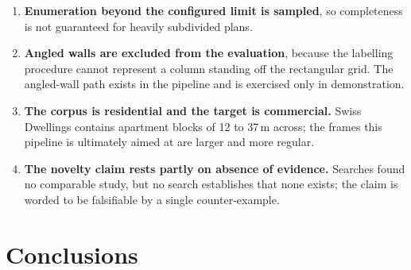 \begin{enumerate}
\item \textbf{Enumeration beyond the configured limit is sampled}, so
completeness is not guaranteed for heavily subdivided plans.

\item \textbf{Angled walls are excluded from the evaluation}, because the
labelling procedure cannot represent a column standing off the rectangular
grid. The angled-wall path exists in the pipeline and is exercised only in
demonstration.

\item \textbf{The corpus is residential and the target is commercial.}
Swiss Dwellings contains apartment blocks of 12 to 37\,m across; the frames
this pipeline is ultimately aimed at are larger and more regular.

\item \textbf{The novelty claim rests partly on absence of evidence.}
Searches found no comparable study, but no search establishes that none
exists; the claim is worded to be falsifiable by a single
counter-example.
\end{enumerate}

\section{Conclusions}

